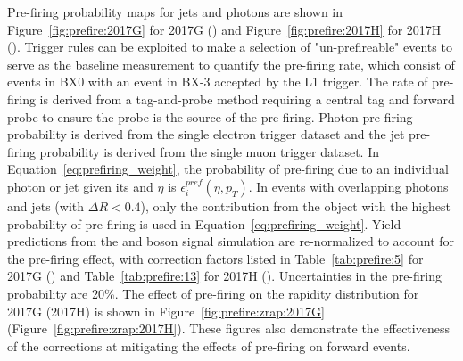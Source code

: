 Pre-firing probability maps for jets and photons are shown in Figure~\ref{fig:prefire:2017G} for 2017G (\serag) and Figure~\ref{fig:prefire:2017H} for 2017H (\serah). Trigger rules can be exploited to make a selection of "un-prefireable" events to serve as the baseline measurement to quantify the pre-firing rate, which consist of events in BX0 with an event in BX-3 accepted by the L1 trigger. The rate of pre-firing is derived from a tag-and-probe method requiring a central tag and forward probe to ensure the probe is the source of the pre-firing.  Photon pre-firing probability is derived from the single electron trigger dataset and the jet pre-firing probability is derived from the single muon trigger dataset. In Equation~\ref{eq:prefiring_weight}, the probability of pre-firing due to an individual photon or jet given its \pt and $\eta$ is $\epsilon_i^{pref}(\eta,p_T)$. In events with overlapping photons and jets (with $\Delta  R < 0.4$), only the contribution from the object with the highest probability of pre-firing is used in Equation~\ref{eq:prefiring_weight}\cite{LATHOMAS}. Yield predictions from the \Wpm and \Z boson signal simulation are re-normalized to account for the pre-firing effect, with correction factors listed in Table~\ref{tab:prefire:5} for 2017G (\serag) and Table~\ref{tab:prefire:13} for 2017H (\serah). Uncertainties in the pre-firing probability are 20\%. The effect of pre-firing on the \zee rapidity distribution for 2017G (2017H) is shown in  Figure~\ref{fig:prefire:zrap:2017G} (Figure~\ref{fig:prefire:zrap:2017H}). These figures also demonstrate the effectiveness of the corrections at mitigating the effects of pre-firing on forward events.


